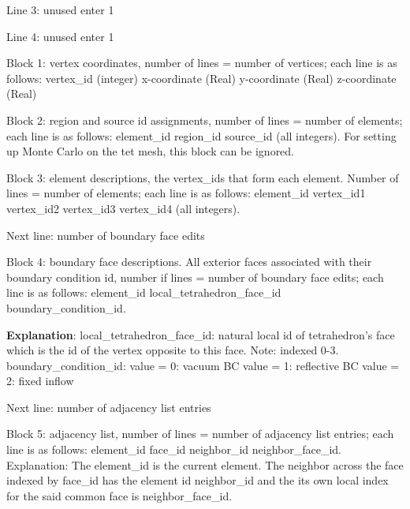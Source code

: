 \noindent Line 3: unused enter 1
\vspace{2mm}

\noindent Line 4: unused enter 1
\vspace{2mm}

\noindent Block 1: vertex coordinates, number of lines = number of vertices; each line is as follows: vertex\_id (integer) x-coordinate (Real) y-coordinate (Real) z-coordinate (Real)
\vspace{2mm}

\noindent Block 2: region and source id assignments, number of lines = number of elements; each line is as follows: element\_id region\_id source\_id (all integers). For setting up Monte Carlo on the tet mesh, this block can be ignored.
\vspace{2mm}

\noindent Block 3: element descriptions, the vertex\_ids that form each element. Number of lines = number of elements; each line is as follows: element\_id vertex\_id1 vertex\_id2 vertex\_id3 vertex\_id4 (all integers).
\vspace{2mm}

\noindent Next line: number of boundary face edits
\vspace{2mm}

\noindent Block 4: boundary face descriptions. All exterior faces associated with their boundary condition id, number if lines = number of boundary face edits; each line is as follows: element\_id local\_tetrahedron\_face\_id boundary\_condition\_id.
\vspace{2mm}

\noindent \textbf{Explanation}:
local\_tetrahedron\_face\_id: natural local id of tetrahedron’s face which is the id of the vertex opposite to this face. Note: indexed 0-3.
boundary\_condition\_id:
value = 0: vacuum BC
value = 1: reflective BC
value = 2: fixed inflow
\vspace{2mm}

\noindent Next line: number of adjacency list entries
\vspace{2mm}

\noindent Block 5: adjacency list, number of lines = number of adjacency list entries; each line is as follows: element\_id face\_id neighbor\_id neighbor\_face\_id.
Explanation: The element\_id is the current element. The neighbor across the face indexed by face\_id has the element id neighbor\_id and the its own local index for the said common face is neighbor\_face\_id.

